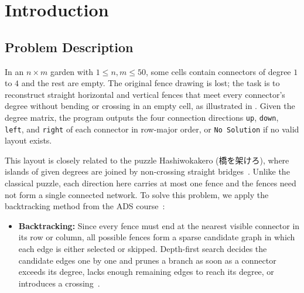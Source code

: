 \documentclass[10pt, a4paper]{article}
\begin{document}
\thispagestyle{plain}
\vspace*{0.3cm}
\tableofcontents
\clearpage

\section{Introduction}

\subsection{Problem Description}
In an $n \times m$ garden with $1 \le n, m \le 50$, some cells contain connectors of degree $1$ to $4$ and the rest are empty. The original fence drawing is lost; the task is to reconstruct straight horizontal and vertical fences that meet every connector's degree without bending or crossing in an empty cell, as illustrated in . Given the degree matrix, the program outputs the four connection directions \texttt{up}, \texttt{down}, \texttt{left}, and \texttt{right} of each connector in row-major order, or \texttt{No Solution} if no valid layout exists.

This layout is closely related to the puzzle Hashiwokakero ({\jpfont 橋を架けろ}), where islands of given degrees are joined by non-crossing straight bridges~\cite{coelho2019hashi}. Unlike the classical puzzle, each direction here carries at most one fence and the fences need not form a single connected network. To solve this problem, we apply the backtracking method from the ADS course~\cite{ads_slides2026}:
\begin{itemize}
  \item \textbf{\color{primary}Backtracking:} Since every fence must end at the nearest visible connector in its row or column, all possible fences form a sparse candidate graph in which each edge is either selected or skipped. Depth-first search decides the candidate edges one by one and prunes a branch as soon as a connector exceeds its degree, lacks enough remaining edges to reach its degree, or introduces a crossing~\cite{ads_slides2026,weiss1996}.
\end{itemize}
\end{document}
